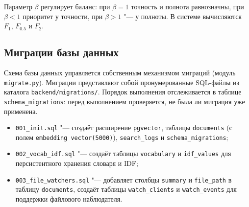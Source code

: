 Параметр $\beta$ регулирует баланс: при $\beta = 1$ точность и полнота равнозначны,
при $\beta < 1$ приоритет у точности, при $\beta > 1$ "--- у полноты.
В системе вычисляются $F_1$, $F_{0.5}$ и $F_2$.

\subsection{Миграции базы данных}

Схема базы данных управляется собственным механизмом миграций (модуль
\texttt{migrate.py}). Миграции представляют собой пронумерованные SQL-файлы
из каталога \texttt{backend/migrations/}. Порядок выполнения отслеживается в
таблице \texttt{schema\_migrations}: перед выполнением проверяется,
не была ли миграция уже применена.

\begin{itemize}
	\item \texttt{001\_init.sql} "--- создаёт расширение \texttt{pgvector},
	      таблицы \texttt{documents} (с полем \texttt{embedding vector(5000)}),
	      \texttt{search\_logs} и \texttt{schema\_migrations};
	\item \texttt{002\_vocab\_idf.sql} "--- создаёт таблицы \texttt{vocabulary}
	      и \texttt{idf\_values} для персистентного хранения словаря и IDF;
	\item \texttt{003\_file\_watchers.sql} "--- добавляет столбцы \texttt{summary}
	      и \texttt{file\_path} в таблицу \texttt{documents}, создаёт таблицы
	      \texttt{watch\_clients} и \texttt{watch\_events} для поддержки
	      файлового наблюдателя.
\end{itemize}
